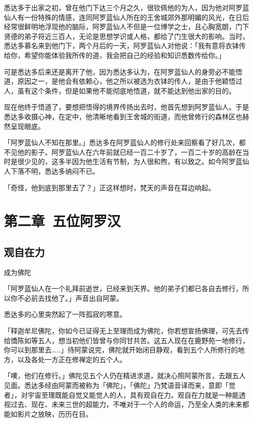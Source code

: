\documentclass[12pt,twoside,openany]{book}
\begin{document}
悉达多于出家之初，曾在他门下达三个月之久，很钦佩他的为人，因为他对阿罗蓝仙人有一份特殊的情感，连同阿罗蓝仙人所在的王舍城郊外那明媚的风光，在日后经常很鲜明地浮现他的脑际，阿罗蓝仙人不但是一位博学之士，且心胸宽朗，门下贤德的弟子将近三百人，无论是思想学识或人格，都给了门生很大的影响。当时，悉达多慕名来到他门下，两个月后的一天，阿罗蓝仙人对他说：「我有意将衣钵传给你，希望你能体验我所传的道，我会把自己的经验和知识悉数传给你。」

可是悉达多后来还是离开了他，因为悉达多认为，在阿罗蓝仙人的身旁必不能悟道，原因之一，是他会有依赖心，他之所以被选为衣钵的传人，是由于他颖悟过人，虽有这个条件，但是如果他不能彻底地悟道，就不能达到他出家的目的。

现在他终于悟道了，要想把悟得的境界传扬出去时，他首先想到阿罗蓝仙人。于是悉达多收摄心神，在定中，他清晰地看到王舍城的街道，而他曾修行的森林区也赫然呈现眼底。

「阿罗蓝仙人不知在那里。」悉达多在阿罗蓝仙人的修行处来回察看了好几次，都不见他的影子。阿罗蓝仙人在六年前就已经一百二十岁了，一百二十岁的高龄在当时是很少见的，这多半因为他生活有节制，为人很和煦，有以致之。如今阿罗蓝仙人下落不明，悉达多纳闷不已。

「奇怪，他到底到那里去了？」正这样想时，梵天的声音在耳边响起。

\chapter{第二章\ 五位阿罗汉}\label{ch2}

\section{观自在力}\label{sec2.1}
成为佛陀

「阿罗蓝仙人在一个礼拜前逝世，已经来到天界。他的弟子们都已各自去修行，所以你不必前去找他了。」声音出自阿蒙。

悉达多的心里突然起了一阵孤寂的寒意。

「释迦牟尼佛陀，你如今已证得无上至理而成为佛陀，你若想宣扬佛理，可先去传给憍陈如等五人，想当初他们皆曾与你同甘共苦。这五人现在在鹿野苑一地修行，你可以到那里去……」待阿蒙说完，佛陀就开始闭目静观，看到五个人所修行的地方，以及各处一方正在修禅定的五个人。

「噢，他们在修行。」佛陀见五个人仍在精进求道，就决心照阿蒙所言，去跟五人见面。悉达多经由阿蒙而被称为「佛陀」，「佛陀」乃梵语音译而来，意即「觉者」，对宇宙至理既能自觉又能觉人的人，具有观自在力。观自在力就是一种能透视过去、现在、未来三世的超能力，不唯对于一个人的命运，乃至全人类的未来都能如影片之放映，历历在目。
\end{document}
